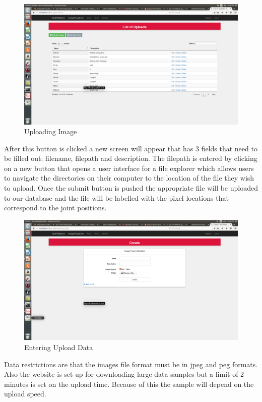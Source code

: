 \documentclass{scrreprt}
\begin{document}
\begin{figure}
  \includegraphics[width=\linewidth]{uploadPage.png}
  \caption{Uploading Image}
  \label{fig:uploadPage}
\end{figure}

After this button is clicked a new screen will appear that has 3 fields that
need to be filled out: filename, filepath and description.  The filepath is
entered by clicking on a new button that opens a user interface for a file
explorer which allows users to navigate the directories on their computer to
the location of the file they wish to upload.  Once the submit button is pushed
the appropriate file will be uploaded to our database and the file will be
labelled with the pixel locations that correspond to the joint positions.

\begin{figure}
  \includegraphics[width=\linewidth]{greenButtonPage.png}
  \caption{Entering Upload Data}
  \label{fig:uploadPage}
\end{figure}

Data restrictions are that the images file format must be in jpeg and peg
formats.  Also the website is set up for downloading large data samples but a
limit of 2 minutes is set on the upload time.  Because of this the sample will
depend on the upload speed.
\end{document}
